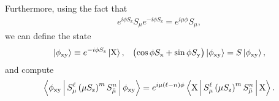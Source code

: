 \documentclass[pra,reprint,longbibliography]{revtex4-1}
\newcommand{\p}[1]{\left(#1\right)} %
\renewcommand{\set}[1]{\left\{#1\right\}} %
\renewcommand{\v}{\bm} %
\newcommand{\bk}{\Braket} %
\renewcommand{\S}{\mathcal{S}}
\newcommand{\z}{\text{z}}
\newcommand{\x}{\text{x}}
\newcommand{\y}{\text{y}}
\newcommand{\X}{\text{X}}
\newcommand{\bmu}{{\bar\mu}}
\newcommand{\1}{\mathds{1}}
\begin{document}
Furthermore, using the fact that
\begin{align}
  e^{i\phi S_\z} S_\mu e^{-i\phi S_\z} = e^{i\mu\phi} S_\mu,
\end{align}
we can define the state
\begin{align}
  \ket{\phi_{\x\y}} \equiv e^{-i\phi S_\z}\ket{\X},
  &&
  \p{\cos\phi S_\x + \sin\phi S_\y} \ket{\phi_{\x\y}}
  = S \ket{\phi_{\x\y}},
\end{align}
and compute
\begin{align}
  \bk{\phi_{\x\y}|S_\mu^\ell \p{\mu S_\z}^m S_\bmu^n|\phi_{\x\y}}
  = e^{i\mu\p{\ell-n}\phi} \bk{\X|S_\mu^\ell \p{\mu S_\z}^m S_\bmu^n|\X}.
\end{align}



\end{document}
